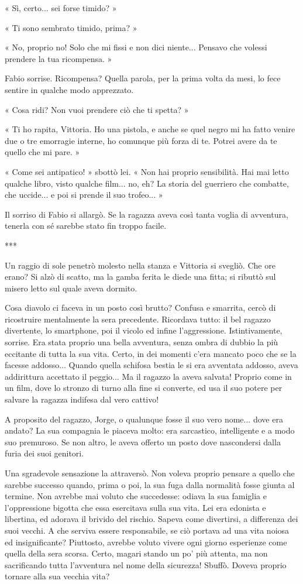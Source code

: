 « Sì, certo... sei forse timido? »

« Ti sono sembrato timido, prima? »

« No, proprio no! Solo che mi fissi e non dici niente... Pensavo che volessi prendere la tua ricompensa. »

Fabio sorrise. Ricompensa? Quella parola, per la prima volta da mesi, lo fece sentire in qualche modo apprezzato.

« Cosa ridi? Non vuoi prendere ciò che ti spetta? »

« Ti ho rapita, Vittoria. Ho una pistola, e anche se quel negro mi ha fatto venire due o tre emorragie interne, ho comunque più forza di te. Potrei avere da te quello che mi pare. »

« Come sei antipatico! » sbottò lei. « Non hai proprio sensibilità. Hai mai letto qualche libro, visto qualche film... no, eh? La storia del guerriero che combatte, che uccide... e poi si prende il suo trofeo... »

Il sorriso di Fabio si allargò. Se la ragazza aveva così tanta voglia di avventura, tenerla con sé sarebbe stato fin troppo facile.

***

Un raggio di sole penetrò molesto nella stanza e Vittoria si svegliò. Che ore erano? Si alzò di scatto, ma la gamba ferita le diede una fitta; si ributtò sul misero letto sul quale aveva dormito.

Cosa diavolo ci faceva in un posto così brutto? Confusa e smarrita, cercò di ricostruire mentalmente la sera precedente. Ricordava tutto: il bel ragazzo divertente, lo smartphone, poi il vicolo ed infine l'aggressione. Istintivamente, sorrise. Era stata proprio una bella avventura, senza ombra di dubbio la più eccitante di tutta la sua vita. Certo, in dei momenti c'era mancato poco che se la facesse addosso... Quando quella schifosa bestia le si era avventata addosso, aveva addirittura accettato il peggio... Ma il ragazzo la aveva salvata! Proprio come in un film, dove lo stronzo di turno alla fine si converte, ed usa il suo potere per salvare la ragazza indifesa dal vero cattivo!

A proposito del ragazzo, Jorge, o qualunque fosse il suo vero nome... dove era andato? La sua compagnia le piaceva molto: era sarcastico, intelligente e a modo suo premuroso. Se non altro, le aveva offerto un posto dove nascondersi dalla furia dei suoi genitori.

Una sgradevole sensazione la attraversò. Non voleva proprio pensare a quello che sarebbe successo quando, prima o poi, la sua fuga dalla normalità fosse giunta al termine. Non avrebbe mai voluto che succedesse: odiava la sua famiglia e l'oppressione bigotta che essa esercitava sulla sua vita. Lei era edonista e libertina, ed adorava il brivido del rischio. Sapeva come divertirsi, a differenza dei suoi vecchi. A che serviva essere responsabile, se ciò portava ad una vita noiosa ed insignificante? Piuttosto, avrebbe voluto vivere ogni giorno esperienze come quella della sera scorsa. Certo, magari stando un po' più attenta, ma non sacrificando tutta l'avventura nel nome della sicurezza! Sbuffò. Doveva proprio tornare alla sua vecchia vita?

